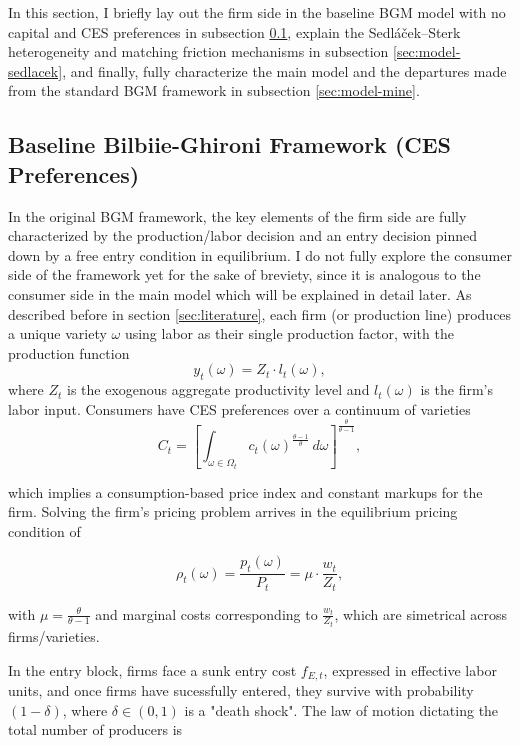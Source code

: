 \documentclass[a4paper,12pt]{article} %
\numberwithin{equation}{section} %
\numberwithin{figure}{section}
\numberwithin{table}{section}
\begin{document}
In this section, I briefly lay out the firm side in the baseline BGM model with no capital and CES preferences in subsection \ref{sec:model-bilbiie}, explain the Sedláček–Sterk
heterogeneity and matching friction mechanisms in subsection \ref{sec:model-sedlacek}, and finally, fully characterize the main model and the departures made
from the standard BGM framework in subsection \ref{sec:model-mine}. 

\subsection{Baseline Bilbiie-Ghironi Framework (CES Preferences)}
\label{sec:model-bilbiie}

In the original BGM framework, the key elements of the firm side are fully characterized by the production/labor decision 
and an entry decision pinned down by a free entry condition in equilibrium. I do not fully explore the consumer side of the framework yet for the sake of breviety, since it is analogous to the consumer side in the main model which will be 
explained in detail later. As described before in section \ref{sec:literature}, each firm (or production line) produces a unique variety $\omega$ using labor as their single 
production factor, with the production function 
\[
    y_t(\omega) = Z_t \cdot l_t(\omega),
\]
where $Z_t$ is the exogenous aggregate productivity level and $l_t(\omega)$ is the firm's labor input. Consumers have CES preferences over a continuum
of varieties 
\[
    C_t = \left[\int_{\omega \in \Omega_t} c_t(\omega)^{\frac{\theta-1}{\theta}}\,d\omega\right]^{\frac{\theta}{\theta-1}},
\]

which implies a consumption-based price index and constant markups for the firm. Solving the firm's pricing problem arrives in the equilibrium pricing
condition of

 \[
    \rho_t(\omega) = \frac{p_t(\omega)}{P_t} =  \mu \cdot \frac{w_t}{Z_t},
 \]

with $\mu=\frac{\theta}{\theta-1}$ and marginal costs corresponding to $\frac{w_t}{Z_t}$, which are simetrical across firms/varieties.

In the entry block, firms face a sunk entry cost $f_{E,t}$, expressed in effective labor units, and once firms have sucessfully entered, they survive
with probability $(1-\delta)$, where $\delta \in (0,1)$ is a "death shock". The law of motion dictating the total number of producers is 
\end{document}

